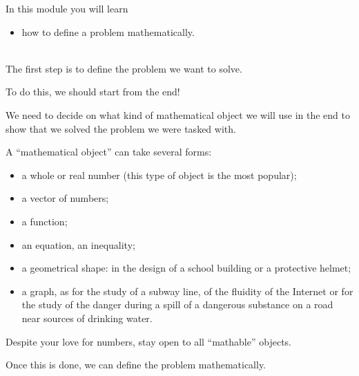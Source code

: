 	In this module you will learn
	\begin{itemize}
		\item how to define a problem mathematically.
	\end{itemize}

\hfill \\


The first step is to define the problem we want to solve.

\begin{important}
	To do this, we should start from the end!
\end{important}

We need to decide on what kind of mathematical object we will use in the end to show that we solved the problem we were tasked with. \\


\begin{definition}
A ``mathematical object'' can take several forms:
\begin{itemize}
	\item a whole or real number (this type of object is the most popular);
	\item a vector of numbers;
	\item a function;
	\item an equation, an inequality;
	\item a geometrical shape: in the design of a school building or a protective helmet;
	\item a graph, as for the study of a subway line, of the fluidity of the Internet or for the study of the danger during a spill of a dangerous substance on a road near sources of drinking water.
\end{itemize}

Despite your love for numbers, stay open to all ``mathable'' objects.
\end{definition}

Once this is done, we can define the problem mathematically. 

